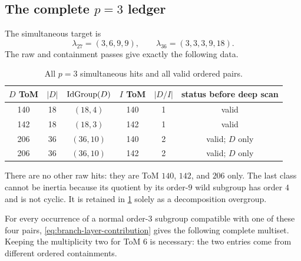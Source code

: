 \subsection{\texorpdfstring{The complete $p=3$ ledger}{The complete p=3 ledger}}

The simultaneous target is
\[
 \lambda_{27}=(3,6,9,9),\qquad
 \lambda_{36}=(3,3,3,9,18).
\]
The raw and containment passes give exactly the following data.

\begin{table}[ht]
\centering
\caption{All $p=3$ simultaneous hits and all valid ordered pairs.}
\label{tab:app-p3-pairs}
\begin{tabular}{@{}c c c c c c@{}}
\toprule
$D$ ToM&$|D|$&$\operatorname{IdGroup}(D)$&$I$ ToM&$|D/I|$&status before deep scan\\
\midrule
140&18&$(18,4)$&140&1&valid\\
142&18&$(18,3)$&142&1&valid\\
206&36&$(36,10)$&140&2&valid; $D$ only\\
206&36&$(36,10)$&142&2&valid; $D$ only\\
\bottomrule
\end{tabular}
\end{table}

There are no other raw hits: they are ToM $140$, $142$, and $206$ only.
The last class cannot be inertia because its quotient by its order-$9$ wild
subgroup has order $4$ and is not cyclic.  It is retained in
\cref{tab:app-p3-pairs} solely as a decomposition overgroup.

For every occurrence of a normal order-$3$ subgroup compatible with one of
these four pairs, \cref{eq:branch-layer-contribution} gives the following
complete multiset.  Keeping the multiplicity two for ToM $6$ is necessary:
the two entries come from different ordered containments.

\begin{table}[ht]
\centering
\caption{Full exact-rational deep-profile calculation at $p=3$.}
\label{tab:app-p3-deep}
\end{table}

